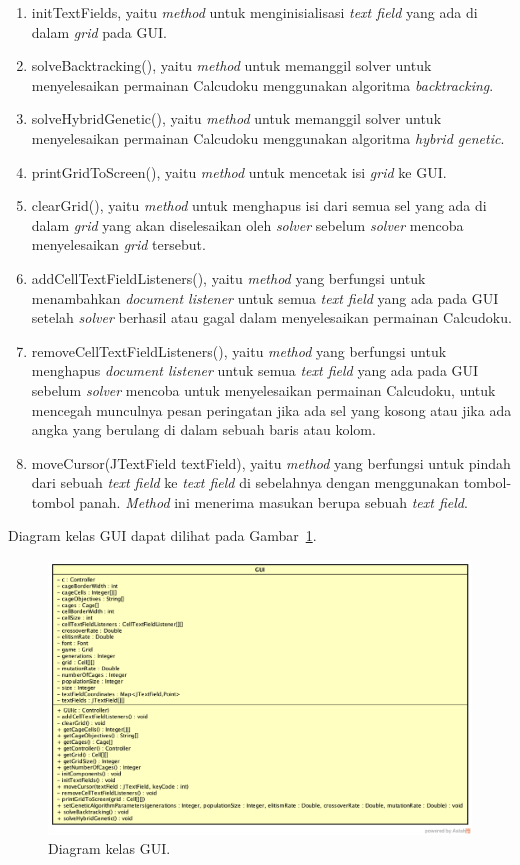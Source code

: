 \begin{enumerate}
\item initTextFields, yaitu \textit{method} untuk menginisialisasi \textit{text field} yang ada di dalam \textit{grid} pada GUI.
\item solveBacktracking(), yaitu \textit{method} untuk memanggil solver untuk menyelesaikan permainan Calcudoku menggunakan algoritma \textit{backtracking}. 
\item solveHybridGenetic(), yaitu \textit{method} untuk memanggil solver untuk menyelesaikan permainan Calcudoku menggunakan algoritma \textit{hybrid genetic}.
\item printGridToScreen(), yaitu \textit{method} untuk mencetak isi \textit{grid} ke GUI.
\item clearGrid(), yaitu \textit{method} untuk menghapus isi dari semua sel yang ada di dalam \textit{grid} yang akan diselesaikan oleh \textit{solver} sebelum \textit{solver} mencoba menyelesaikan \textit{grid} tersebut.
\item addCellTextFieldListeners(), yaitu \textit{method} yang berfungsi untuk menambahkan \textit{document listener} untuk semua \textit{text field} yang ada pada GUI setelah \textit{solver} berhasil atau gagal dalam menyelesaikan permainan Calcudoku.
\item removeCellTextFieldListeners(), yaitu \textit{method} yang berfungsi untuk menghapus \textit{document listener} untuk semua \textit{text field} yang ada pada GUI sebelum \textit{solver} mencoba untuk menyelesaikan permainan Calcudoku, untuk mencegah munculnya pesan peringatan jika ada sel yang kosong atau jika ada angka yang berulang di dalam sebuah baris atau kolom.
\item moveCursor(JTextField textField), yaitu \textit{method} yang berfungsi untuk pindah dari sebuah \textit{text field} ke \textit{text field} di sebelahnya dengan menggunakan tombol-tombol panah. \textit{Method} ini menerima masukan berupa sebuah \textit{text field}.
\end{enumerate}

Diagram kelas GUI dapat dilihat pada Gambar~\ref{fig:diagramkelasgui}.

\begin{figure}
\centering
\captionsetup{justification=centering}
\includegraphics[scale=0.333]{Gambar/Perancangan/DiagramKelasGUI.png}
\caption[Diagram kelas GUI.]{Diagram kelas GUI.}
\label{fig:diagramkelasgui}
\end{figure}

